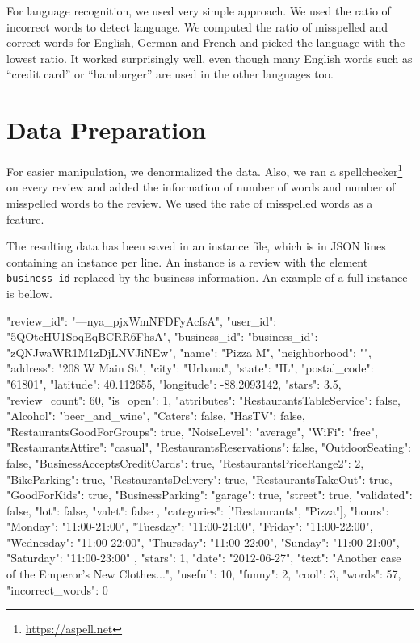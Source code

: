 For language recognition, we used very simple approach.
We used the ratio of incorrect words to detect language.
We computed the ratio of misspelled and correct words for English, German and French and
picked the language with the lowest ratio.
It worked surprisingly well, even though many English words such as ``credit card'' or ``hamburger'' are used in the other languages too.

\section{Data Preparation}

For easier manipulation, we denormalized the data.
Also, we ran a spellchecker\footnote{\url{https://aspell.net}} on every review and added the information of number of words and number of misspelled words to the review.
We used the rate of misspelled words as a feature.

The resulting data has been saved in an instance file,
which is in JSON lines containing an instance per line.
An instance is a review with the element \texttt{business\_id} replaced by the business information.
An example of a full instance is bellow.

\begin{code}
{
	"review_id": "---nya_pjxWmNFDFyAcfsA",
	"user_id": "5QOtcHU1SoqEqBCRR6FhsA",
	"business_id": {
		"business_id": "zQNJwaWR1M1zDjLNVJiNEw",
		"name": "Pizza M",
		"neighborhood": "",
		"address": "208 W Main St",
		"city": "Urbana",
		"state": "IL",
		"postal_code": "61801",
		"latitude": 40.112655,
		"longitude": -88.2093142,
		"stars": 3.5,
		"review_count": 60,
		"is_open": 1,
		"attributes": {
			"RestaurantsTableService": false,
			"Alcohol": "beer_and_wine",
			"Caters": false,
			"HasTV": false,
			"RestaurantsGoodForGroups": true,
			"NoiseLevel": "average",
			"WiFi": "free",
			"RestaurantsAttire": "casual",
			"RestaurantsReservations": false,
			"OutdoorSeating": false,
			"BusinessAcceptsCreditCards": true,
			"RestaurantsPriceRange2": 2,
			"BikeParking": true,
			"RestaurantsDelivery": true,
			"RestaurantsTakeOut": true,
			"GoodForKids": true,
			"BusinessParking": {
				"garage": true,
				"street": true,
				"validated": false,
				"lot": false,
				"valet": false
			}
		},
		"categories": ["Restaurants", "Pizza"],
		"hours": {
			"Monday": "11:00-21:00",
			"Tuesday": "11:00-21:00",
			"Friday": "11:00-22:00",
			"Wednesday": "11:00-22:00",
			"Thursday": "11:00-22:00",
			"Sunday": "11:00-21:00",
			"Saturday": "11:00-23:00"
		}
	},
	"stars": 1,
	"date": "2012-06-27",
	"text": "Another case of the Emperor's New Clothes...",
	"useful": 10,
	"funny": 2,
	"cool": 3,
	"words": 57,
	"incorrect_words": 0
}
\end{code}


